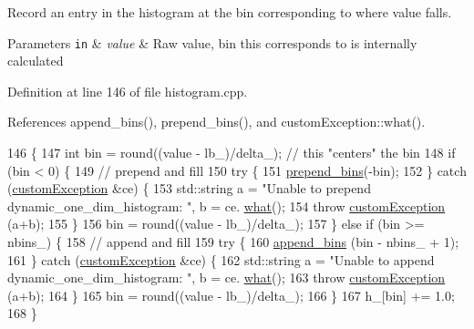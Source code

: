 Record an entry in the histogram at the bin corresponding to where value falls. 


\begin{DoxyParams}[1]{Parameters}
\mbox{\tt in}  & {\em value} & Raw value, bin this corresponds to is internally calculated \\
\hline
\end{DoxyParams}


Definition at line 146 of file histogram.\-cpp.



References append\-\_\-bins(), prepend\-\_\-bins(), and custom\-Exception\-::what().


\begin{DoxyCode}
146                                                           \{
147     \textcolor{keywordtype}{int} bin = round((value - lb\_)/delta\_); \textcolor{comment}{// this "centers" the bin}
148     \textcolor{keywordflow}{if} (bin < 0) \{
149         \textcolor{comment}{// prepend and fill}
150         \textcolor{keywordflow}{try} \{
151             \hyperlink{classdynamic__one__dim__histogram_a03402a7219e10240803609fb6cbb24a6}{prepend\_bins}(-bin);
152         \} \textcolor{keywordflow}{catch} (\hyperlink{classcustom_exception}{customException} &ce) \{
153             std::string a = \textcolor{stringliteral}{"Unable to prepend dynamic\_one\_dim\_histogram: "}, b = ce.
      \hyperlink{classcustom_exception_aeb6ab5848b038adfc68fde86a512f691}{what}();
154             \textcolor{keywordflow}{throw} \hyperlink{classcustom_exception}{customException} (a+b);
155         \}
156         bin = round((value - lb\_)/delta\_);
157     \} \textcolor{keywordflow}{else} \textcolor{keywordflow}{if} (bin >= nbins\_) \{
158         \textcolor{comment}{// append and fill}
159         \textcolor{keywordflow}{try} \{
160             \hyperlink{classdynamic__one__dim__histogram_a6fa516279d227e363aa90baf29f8a181}{append\_bins} (bin - nbins\_ + 1);
161         \} \textcolor{keywordflow}{catch} (\hyperlink{classcustom_exception}{customException} &ce) \{
162             std::string a = \textcolor{stringliteral}{"Unable to append dynamic\_one\_dim\_histogram: "}, b = ce.
      \hyperlink{classcustom_exception_aeb6ab5848b038adfc68fde86a512f691}{what}();
163             \textcolor{keywordflow}{throw} \hyperlink{classcustom_exception}{customException} (a+b);
164         \}
165         bin = round((value - lb\_)/delta\_);
166     \}
167     h\_[bin] += 1.0;
168 \}
\end{DoxyCode}
